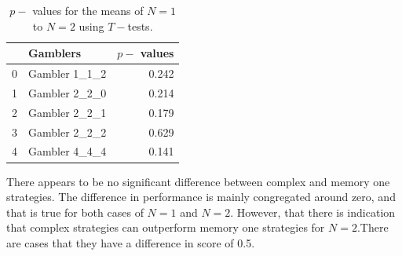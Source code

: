 \documentclass[10pt]{article}
\begin{document}
\begin{table}
    \begin{center}
    \begin{tabular}{llr}
        \toprule
        {} &       Gamblers &  \(p-\) values \\
        \midrule
        0 &  Gambler 1\_1\_2 &              0.242 \\
        1 &  Gambler 2\_2\_0 &              0.214 \\
        2 &  Gambler 2\_2\_1 &              0.179 \\
        3 &  Gambler 2\_2\_2 &              0.629 \\
        4 &  Gambler 4\_4\_4 &              0.141 \\
        \bottomrule
    \end{tabular}
    \caption{\(p-\) values for the means of \(N=1\) to \(N=2\) using \(T-\)tests.}
    \label{table:p_values}
    \end{center}
\end{table}

There appears to be no significant difference between complex and memory one strategies.
The difference in performance is mainly congregated around zero, and that is true for both
cases of \(N=1\) and \(N=2\). However, that there is indication that
complex strategies can outperform memory one strategies for \(N=2\).There
are cases that they have a difference in score of 0.5.
\end{document}
